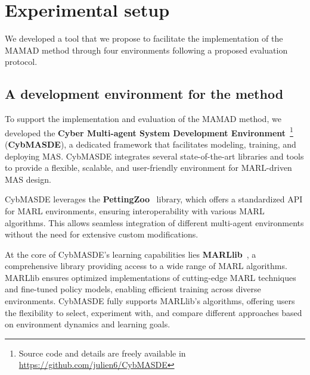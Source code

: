 \documentclass[pdflatex,sn-mathphys-num]{sn-jnl}%
\theoremstyle{thmstyleone}%
\theoremstyle{thmstyletwo}%
\theoremstyle{thmstylethree}%
\begin{document}
\section{Experimental setup}
\label{sec:experimental_setup}

We developed a tool that we propose to facilitate the implementation of the MAMAD method through four environments following a proposed evaluation protocol.

\subsection{A development environment for the method}

To support the implementation and evaluation of the MAMAD method, we developed the \textbf{Cyber Multi-agent System Development Environment}~\footnote{Source code and details are freely available in \url{https://github.com/julien6/CybMASDE}} (\textbf{CybMASDE}), a dedicated framework that facilitates modeling, training, and deploying MAS. CybMASDE integrates several state-of-the-art libraries and tools to provide a flexible, scalable, and user-friendly environment for MARL-driven MAS design.

CybMASDE leverages the \textbf{PettingZoo}~\cite{Terry2021} library, which offers a standardized API for MARL environments, ensuring interoperability with various MARL algorithms. This allows seamless integration of different multi-agent environments without the need for extensive custom modifications.

At the core of CybMASDE's learning capabilities lies \textbf{MARLlib}~\cite{hu2022marllib}, a comprehensive library providing access to a wide range of MARL algorithms. MARLlib ensures optimized implementations of cutting-edge MARL techniques and fine-tuned policy models, enabling efficient training across diverse environments. CybMASDE fully supports MARLlib's algorithms, offering users the flexibility to select, experiment with, and compare different approaches based on environment dynamics and learning goals.
\end{document}
